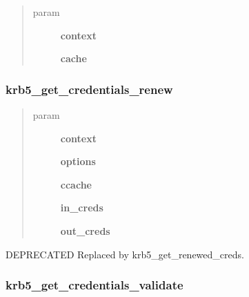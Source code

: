 \documentclass[letterpaper,10pt,english]{sphinxmanual}
\begin{document}
\begin{quote}\begin{description}
\item[{param}] \leavevmode
\textbf{context}

\textbf{cache}

\end{description}\end{quote}


\subsubsection{krb5\_get\_credentials\_renew}
\label{appdev/refs/api/krb5_get_credentials_renew:krb5-get-credentials-renew}\label{appdev/refs/api/krb5_get_credentials_renew::doc}

\begin{fulllineitems}
\label{appdev/refs/api/krb5_get_credentials_renew:c.krb5_get_credentials_renew}
\end{fulllineitems}

\begin{quote}\begin{description}
\item[{param}] \leavevmode
\textbf{context}

\textbf{options}

\textbf{ccache}

\textbf{in\_creds}

\textbf{out\_creds}

\end{description}\end{quote}

DEPRECATED Replaced by krb5\_get\_renewed\_creds.


\subsubsection{krb5\_get\_credentials\_validate}
\label{appdev/refs/api/krb5_get_credentials_validate:krb5-get-credentials-validate}\label{appdev/refs/api/krb5_get_credentials_validate::doc}
\end{document}
